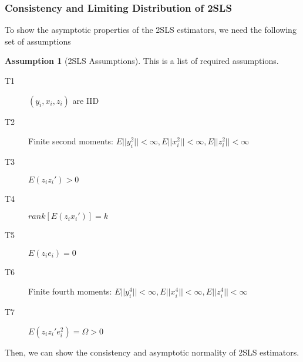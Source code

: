 \documentclass[12pt]{article}
\theoremstyle{definition}
\theoremstyle{property}
\theoremstyle{assumption}
\newtheorem{assumption}{Assumption}[section]
\theoremstyle{example}
\theoremstyle{comment}
\begin{document}
\subsubsection{Consistency and Limiting Distribution of 2SLS}
To show the asymptotic properties of the 2SLS estimators, we need the following set of assumptions
\begin{mdframed}[backgroundcolor=blue!5] 
\begin{assumption}[2SLS Assumptions] This is a list of required assumptions. 
\begin{description}
\item[T1] $(y_i, x_i, z_i)$ are IID
\item[T2] Finite second moments: $E||y_i^2||<\infty, E||x_i^2||<\infty, E||z_i^2||<\infty$
\item[T3] $E(z_iz_i')>0$
\item[T4] $rank[E(z_ix_i')]=k$
\item[T5] $E(z_ie_i)=0$
\item[T6] Finite fourth moments: $E||y_i^4||<\infty, E||x_i^4||<\infty, E||z_i^4||<\infty$
\item[T7] $E(z_iz_i'e_i^2)=\Omega>0$
\end{description}
\end{assumption}
\end{mdframed}\par
Then, we can show the consistency and asymptotic normality of 2SLS estimators. 
\end{document}
